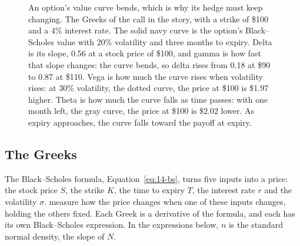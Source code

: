 \begin{figure}[htbp]
{%
}
\caption{An option's value curve bends, which is why its hedge must keep changing. The Greeks of the call in the story, with a strike of \$100 and a 4\% interest rate. The solid navy curve is the option's Black--Scholes value with 20\% volatility and three months to expiry. Delta is its slope, 0.56 at a stock price of \$100, and gamma is how fast that slope changes: the curve bends, so delta rises from 0.18 at \$90 to 0.87 at \$110. Vega is how much the curve rises when volatility rises: at 30\% volatility, the dotted curve, the price at \$100 is \$1.97 higher. Theta is how much the curve falls as time passes: with one month left, the gray curve, the price at \$100 is \$2.02 lower. As expiry approaches, the curve falls toward the payoff at expiry.}
\label{fig:14-bs}
\end{figure}

\subsection{The Greeks}
\label{sec:14-greeks}

The Black--Scholes formula, Equation~\eqref{eq:14-bs}, turns five inputs into a price: the stock price $S$, the strike $K$, the time to expiry $T$, the interest rate $r$ and the volatility $\sigma$.  measure how the price changes when one of these inputs changes, holding the others fixed. Each Greek is a derivative of the formula, and each has its own Black--Scholes expression. In the expressions below, $n$ is the standard normal density, the slope of $N$.

